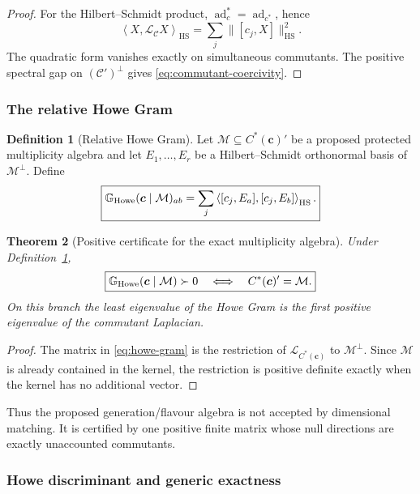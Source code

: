 \documentclass[11pt]{article}
\newtheorem{theorem}{Theorem}[section]
\theoremstyle{definition}
\newtheorem{definition}[theorem]{Definition}
\theoremstyle{remark}
\newcommand{\HS}{\mathrm{HS}}
\newcommand{\norm}[1]{\lVert#1\rVert}
\newcommand{\ip}[2]{\left\langle#1,#2\right\rangle}
\newcommand{\M}{\mathcal M}
\begin{document}
\begin{proof}
For the Hilbert--Schmidt product,
$\operatorname{ad}_c^*=\operatorname{ad}_{c^*}$, hence
\[
\ip{X}{\mathscr L_{\mathcal C}X}_{\HS}
=
\sum_j\norm{[c_j,X]}_{\HS}^2.
\]
The quadratic form vanishes exactly on simultaneous commutants.  The positive
spectral gap on $(\mathcal C')^\perp$ gives
\eqref{eq:commutant-coercivity}.
\end{proof}

\subsubsection{The relative Howe Gram}

\begin{definition}[Relative Howe Gram]
\label{def:howe-gram}
Let $\M\subseteq C^*(\bm c)'$ be a proposed protected multiplicity algebra and
let $E_1,\ldots,E_r$ be a Hilbert--Schmidt orthonormal basis of
$\M^\perp$.  Define
\begin{equation}
\boxed{
\mathbb G_{\rm Howe}(\bm c\mid\M)_{ab}
=
\sum_j
\left\langle[c_j,E_a],[c_j,E_b]\right\rangle_{\HS}.}
\label{eq:howe-gram}
\end{equation}
\end{definition}

\begin{theorem}[Positive certificate for the exact multiplicity algebra]
\label{thm:howe-certificate}
Under Definition~\ref{def:howe-gram},
\begin{equation}
\boxed{
\mathbb G_{\rm Howe}(\bm c\mid\M)\succ0
\quad\Longleftrightarrow\quad
C^*(\bm c)'=\M.}
\label{eq:howe-certificate}
\end{equation}
On this branch the least eigenvalue of the Howe Gram is the first positive
eigenvalue of the commutant Laplacian.
\end{theorem}

\begin{proof}
The matrix in \eqref{eq:howe-gram} is the restriction of
$\mathscr L_{C^*(\bm c)}$ to $\M^\perp$.  Since $\M$ is already contained in
the kernel, the restriction is positive definite exactly when the kernel has
no additional vector.
\end{proof}

Thus the proposed generation/flavour algebra is not accepted by dimensional
matching.  It is certified by one positive finite matrix whose null directions
are exactly unaccounted commutants.


\subsubsection{Howe discriminant and generic exactness}
\label{sec:howe-discriminant}
\end{document}
